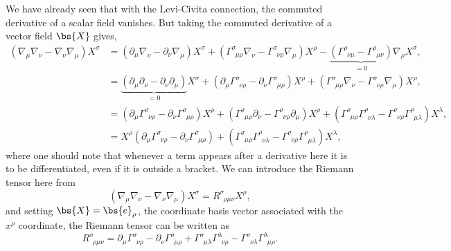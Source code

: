 We have already seen that with the Levi-Civita connection, the commuted derivative of a scalar field vanishes. But taking the commuted derivative of a vector field $\bs{X}$ gives,
\begin{align}
(\nabla_\mu \nabla_\nu  - \nabla_\nu \nabla_\mu )X^\sigma &=(\partial_\mu \nabla_\nu  - \partial_\nu \nabla_\mu )X^\sigma + (\Gamma^{\sigma}_{\,\,\,\mu\rho}\nabla_\nu -\Gamma^{\sigma}_{\,\,\,\nu\rho}\nabla_\mu  )X^\rho - \underbrace{(\Gamma^{\rho}_{\,\,\,\nu\mu} - \Gamma^{\rho}_{\,\,\,\mu\nu})}_{=0}\nabla_\rho X^\sigma , \\
                         &=\underbrace{(\partial_\mu \partial_\nu  - \partial_\nu \partial_\mu )}_{=0}X^\sigma + (\partial_\mu \Gamma^\sigma_{\,\,\,\nu\rho}  - \partial_\nu \Gamma^\sigma_{\,\,\,\mu\rho} )X^\rho + (\Gamma^{\sigma}_{\,\,\,\mu\rho}\nabla_\nu -\Gamma^{\sigma}_{\,\,\,\nu\rho}\nabla_\mu  )X^\rho  , \\
                         &=(\partial_\mu \Gamma^\sigma_{\,\,\,\nu\rho}  - \partial_\nu \Gamma^\sigma_{\,\,\,\mu\rho} )X^\rho + (\Gamma^{\sigma}_{\,\,\,\mu\rho}\partial_\nu -\Gamma^{\sigma}_{\,\,\,\nu\rho}\partial_\mu  )X^\rho 
                         + (\Gamma^{\sigma}_{\,\,\,\mu\rho}\Gamma^\rho_{\,\,\,\nu\lambda} -\Gamma^{\sigma}_{\,\,\,\nu\rho}\Gamma^\rho_{\,\,\,\mu\lambda} )X^\lambda,\\
                         &=X^\rho(\partial_\mu \Gamma^\sigma_{\,\,\,\nu\rho}  - \partial_\nu \Gamma^\sigma_{\,\,\,\mu\rho} ) + (\Gamma^{\sigma}_{\,\,\,\mu\rho}\Gamma^\rho_{\,\,\,\nu\lambda} -\Gamma^{\sigma}_{\,\,\,\nu\rho}\Gamma^\rho_{\,\,\,\mu\lambda} )X^\lambda,
\end{align}
where one should note that whenever a term appears after a derivative here it is to be differentiated, even if it is outside a bracket. We can introduce the Riemann tensor here from
\begin{equation}
(\nabla_\mu \nabla_\nu  - \nabla_\nu \nabla_\mu )X^\sigma = R^\sigma_{\,\,\,\rho\mu\nu} X^\rho,
\end{equation}
and setting $\bs{X} = \bs{e}_{\rho}$, the coordinate basis vector associated with the $x^\rho$ coordinate, the Riemann tensor can be written as
\begin{equation}
R^\sigma_{\,\,\,\rho\mu\nu} = \partial_\mu \Gamma^\sigma_{\,\,\,\nu\rho}  - \partial_\nu \Gamma^\sigma_{\,\,\,\mu\rho}  + \Gamma^{\sigma}_{\,\,\,\mu\lambda}\Gamma^\lambda_{\,\,\,\nu\rho} -\Gamma^{\sigma}_{\,\,\,\nu\lambda}\Gamma^\lambda_{\,\,\,\mu\rho}. 
\end{equation}
